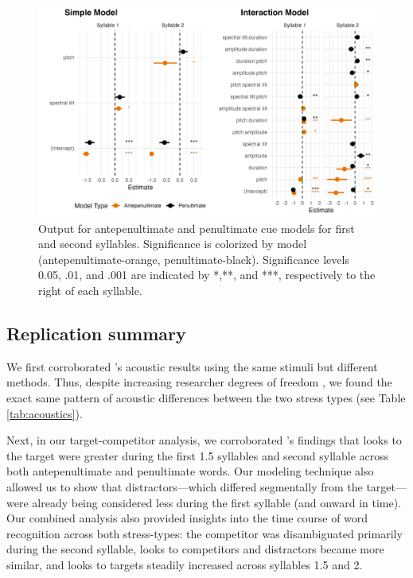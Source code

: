 \begin{figure}[H]
  \centering
    \includegraphics[width=1\linewidth]{visuals/combined_plot_o_n.jpeg} %

  \caption{Output for antepenultimate and penultimate cue models for first and second syllables. Significance is colorized by model (antepenultimate-orange, penultimate-black). Significance levels 0.05, .01, and .001 are indicated by *,**, and ***, respectively to the right of each syllable.}
  \label{fig:analysis_3_plot }
\end{figure}

\subsection{Replication summary}
We first corroborated \cite{Sulpizio_McQueen_2012}'s acoustic results using the same stimuli but different methods. Thus, despite increasing researcher degrees of freedom \citep{Corretta2023}, we found the exact same pattern of acoustic differences between the two stress types (see Table \ref{tab:acoustics}).

Next, in our target-competitor analysis, we corroborated \cite{Sulpizio_McQueen_2012}'s findings that looks to the target were greater during the first 1.5 syllables and second syllable across both antepenultimate and penultimate words. Our modeling technique also allowed us to show that distractors---which differed segmentally from the target---were already being considered less during the first syllable (and onward in time). Our combined analysis also provided insights into the time course of word recognition across both stress-types: the competitor was disambiguated primarily during the second syllable, looks to competitors and distractors became more similar, and looks to targets steadily increased across syllables 1.5 and 2.

